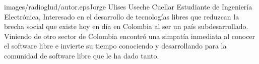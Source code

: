 \begin{multicols}{2}
\begin{biografia}{images/radioglud/autor.eps}{Jorge Ulises Useche Cuellar} Estudiante de Ingeniería Electrónica, Interesado en el desarrollo de tecnologías libres que reduzcan la brecha social que existe hoy en día en Colombia al ser un país subdesarrollado. Viniendo de otro sector de Colombia encontró una simpatía inmediata al conocer el software libre e invierte su tiempo conociendo y desarrollando para la comunidad de software libre que le ha dado tanto.
\end{biografia}

\raggedcolumns
\pagebreak


\end{multicols}

\clearpage
\pagebreak
